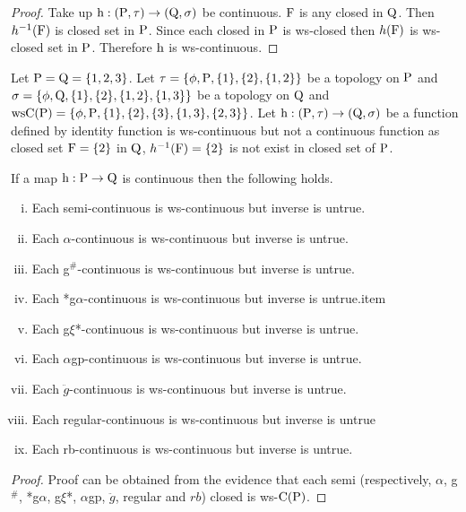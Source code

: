 \begin{proof}
Take up $\mathrm{h}:(\mathrm{P},\tau )\to(\mathrm{Q}, \sigma)$ be continuous. $\mathrm{F}$ is any closed in $\mathrm{Q}$. Then $h^{-1} (\mathrm{F})$ is closed set in $\mathrm{P}$. Since each closed in $\mathrm{P}$ is ws-closed then $h(\mathrm{F})$ is ws-closed set in $\mathrm{P}$. Therefore $\mathrm{h}$ is ws-continuous.
\end{proof}

\begin{exm}\label{exam3.2.2}
Let $\mathrm{P}=\mathrm{Q}= \{1, 2, 3\}$. Let $\tau = \{\phi, \mathrm{P}, \{1\}, \{2\}, \{1, 2\}\}$ be a topology on $\mathrm{P}$ and $\sigma = \{ \phi, \mathrm{Q}, \{1\}, \{2\}, \{1, 2\}, \{1, 3\}\}$ be a topology on $\mathrm{Q}$ and $\mathrm{ws}\mathrm{C}(\mathrm{P}) = \{\phi, \mathrm{P}, \{1\}, \{2\},\{3\}, \{1, 3\},\{2, 3\}\}$. Let $\mathrm{h}: (\mathrm{P},\tau )\to (\mathrm{Q}, \sigma)$ be a function defined by identity function is ws-continuous but not a continuous function as closed set $\mathrm{F}=\{2\}$ in $\mathrm{Q}$, $h^{-1} (\mathrm{F})=\{2\}$ is not exist in closed set of $\mathrm{P}$.
\end{exm}

\begin{thm}\label{thm3.2.2}
If a map $\mathrm{h}: \mathrm{P}\to \mathrm{Q}$ is continuous then the following holds.
\begin{enumerate}[(i)]
\item Each semi-continuous is ws-continuous but inverse is untrue.
\item Each $\alpha$-continuous is ws-continuous but inverse is untrue.
\item Each g$^{\#}$-continuous is ws-continuous but inverse is untrue.
\item Each *g$\alpha$-continuous is ws-continuous but inverse is untrue.item
\item Each g$\xi$*-continuous is ws-continuous but inverse is untrue.
\item Each $\alpha$gp-continuous is ws-continuous but inverse is untrue.
\item Each $\ddot{g}$-continuous is ws-continuous but inverse is untrue.
\item Each regular-continuous is ws-continuous but inverse is untrue
\item Each rb-continuous is ws-continuous but inverse is untrue.
\end{enumerate}
\end{thm}

\begin{proof}
Proof can be obtained from the evidence that each semi (respectively, $\alpha$, g$^{\#}$, *g$\alpha$, g$\xi$*, $\alpha$gp, $\ddot{g}$, regular and $rb$) closed is ws-$\mathrm{C}(\mathrm{P})$.
\end{proof}

